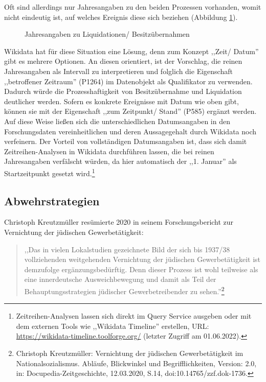 Oft sind allerdings nur Jahresangaben zu den beiden Prozessen vorhanden, womit nicht eindeutig ist, auf welches Ereignis diese sich beziehen (Abbildung \ref{fig:datavernichtung}).   

\begin{figure}[h]
    \centering
    \caption{Jahresangaben zu Liquidationen/ Besitzübernahmen}
    \label{fig:datavernichtung}
\end{figure}

Wikidata hat für diese Situation eine Lösung, denn zum Konzept ,,Zeit/ Datum'' gibt es mehrere Optionen. An diesen orientiert, ist der Vorschlag, die reinen Jahresangaben als Intervall zu interpretieren und folglich die Eigenschaft ,,betroffener Zeitraum'' (P1264) im Datenobjekt als Qualifikator zu verwenden. Dadurch würde die Prozesshaftigkeit von Besitzübernahme und Liquidation deutlicher werden. Sofern es konkrete Ereignisse mit Datum wie oben gibt, können sie mit der Eigenschaft ,,zum Zeitpunkt/ Stand'' (P585) ergänzt werden. Auf diese Weise ließen sich die unterschiedlichen Datumsangaben in den Forschungsdaten vereinheitlichen und deren Aussagegehalt durch Wikidata noch verfeinern. Der Vorteil von vollständigen Datumsangaben ist, dass sich damit Zeitreihen-Analysen in Wikidata durchführen lassen, die bei reinen Jahresangaben verfälscht würden, da hier automatisch der ,,1. Januar'' als Startzeitpunkt gesetzt wird.\footnote{Zeitreihen-Analysen lassen sich direkt im Query Service ausgeben oder mit dem externen Tools wie ,,Wikidata Timeline'' erstellen, URL: \url{https://wikidata-timeline.toolforge.org/} (letzter Zugriff am 01.06.2022).} 


\subsection{Abwehrstrategien}

Christoph Kreutzmüller resümierte 2020 in seinem Forschungsbericht zur Vernichtung der jüdischen Gewerbetätigkeit:

\begin{quote}
    ,,Das in vielen Lokalstudien gezeichnete Bild der sich bis 1937/38 vollziehenden weitgehenden Vernichtung der jüdischen Gewerbetätigkeit ist demzufolge ergänzungsbedürftig. Denn dieser Prozess ist wohl teilweise als eine innerdeutsche Ausweichbewegung und damit als Teil der Behauptungsstrategien jüdischer Gewerbetreibender zu sehen.''\footnote{Christoph Kreutzmüller: Vernichtung der jüdischen Gewerbetätigkeit im Nationalsozialismus. Abläufe, Blickwinkel und Begrifflichkeiten, Version: 2.0, in: Docupedia-Zeitgeschichte, 12.03.2020, S.14, doi:10.14765/zzf.dok-1736.}
\end{quote}

